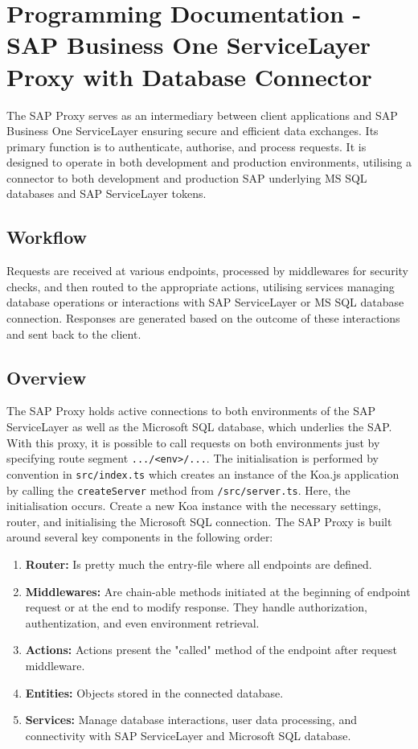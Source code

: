 \chapter{Programming Documentation - SAP Business One ServiceLayer Proxy with Database Connector}
\label{attachments:programming-sap}

The SAP Proxy serves as an intermediary between client applications and SAP Business One ServiceLayer ensuring secure and efficient data exchanges.
Its primary function is to authenticate, authorise, and process requests.
It is designed to operate in both development and production environments, utilising a connector to both development and production SAP underlying MS SQL databases and SAP ServiceLayer tokens. 

\section{Workflow}
Requests are received at various endpoints, processed by middlewares for security checks, and then routed to the appropriate actions, utilising services managing database operations or interactions with SAP ServiceLayer or MS SQL database connection.
Responses are generated based on the outcome of these interactions and sent back to the client.

\section{Overview}
The SAP Proxy holds active connections to both environments of the SAP ServiceLayer as well as the Microsoft SQL database, which underlies the SAP.
With this proxy, it is possible to call requests on both environments just by specifying route segment \texttt{.../<env>/...}.
The initialisation is performed by convention in \texttt{src/index.ts} which creates an instance of the Koa.js application by calling the \texttt{createServer} method from \texttt{/src/server.ts}.
Here, the initialisation occurs. 
Create a new Koa instance with the necessary settings, router, and initialising the Microsoft SQL connection.
The SAP Proxy is built around several key components in the following order:
\begin{enumerate}
    \item \textbf{Router:} Is pretty much the entry-file where all endpoints are defined.
    \item \textbf{Middlewares:} Are chain-able methods initiated at the beginning of endpoint request or at the end to modify response. They handle authorization, authentization, and even environment retrieval. 
    \item \textbf{Actions:} Actions present the "called" method of the endpoint after request middleware.
    \item \textbf{Entities:} Objects stored in the connected database.
    \item \textbf{Services:} Manage database interactions, user data processing, and connectivity with SAP ServiceLayer and Microsoft SQL database.
\end{enumerate}

